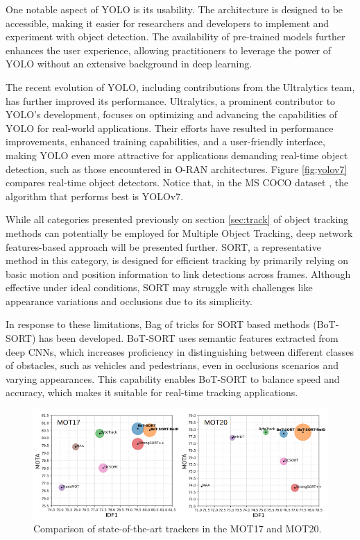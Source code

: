 One notable aspect of YOLO is its usability. The architecture is designed to be accessible, making it easier for researchers and developers to implement and experiment with object detection. The availability of pre-trained models further enhances the user experience, allowing practitioners to leverage the power of YOLO without an extensive background in deep learning.

The recent evolution of YOLO, including contributions from the Ultralytics \cite{ultralytics_docs} team, has further improved its performance. Ultralytics, a prominent contributor to YOLO's development, focuses on optimizing and advancing the capabilities of YOLO for real-world applications. Their efforts have resulted in performance improvements, enhanced training capabilities, and a user-friendly interface, making YOLO even more attractive for applications demanding real-time object detection, such as those encountered in O-RAN architectures. Figure \ref{fig:yolov7} compares real-time object detectors. Notice that, in the MS COCO dataset \cite{COCO}, the algorithm that performs best is YOLOv7. 

While all categories presented previously on section \ref{sec:track} of object tracking methods can potentially be employed for Multiple Object Tracking, deep network features-based approach will be presented further. SORT, a representative method in this category, is designed for efficient tracking by primarily relying on basic motion and position information to link detections across frames. Although effective under ideal conditions, SORT may struggle with challenges like appearance variations and occlusions due to its simplicity.

In response to these limitations, Bag of tricks for SORT based methods (BoT-SORT) has been developed. BoT-SORT uses semantic features extracted from deep CNNs, which increases proficiency in distinguishing between different classes of obstacles, such as vehicles and pedestrians, even in occlusions scenarios and varying appearances. This capability enables BoT-SORT to balance speed and accuracy, which makes it suitable for real-time tracking applications. 


\begin{figure}[H]
    \centering
    \includegraphics[width=0.6\linewidth]{figures/botsort.png}
    \caption[Comparison of state-of-the-art trackers in the MOT17 and MOT20]{ Comparison of state-of-the-art trackers in the MOT17 and MOT20\cite{botsort}.}
    \label{fig:botsort}
\end{figure}

